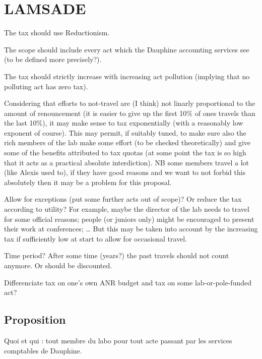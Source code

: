 \documentclass[version=3.21, pagesize, twoside=off, bibliography=totoc, DIV=calc, fontsize=12pt, a4paper, french, english]{scrartcl}
\begin{document}
\section{LAMSADE}

The tax should use Reductionism.

The scope should include every act which the Dauphine accounting services see (to be defined more precisely?).

The tax should strictly increase with increasing act pollution (implying that no polluting act has zero tax).

Considering that efforts to not-travel are (I think) not linarly proportional to the amount of renouncement (it is easier to give up the first 10\% of ones travels than the last 10\%), it may make sense to tax exponentially (with a reasonably low exponent of course). This may permit, if suitably tuned, to make sure also the rich members of the lab make some effort (to be checked theoretically) and give some of the benefits attributed to tax quotas (at some point the tax is so high that it acts as a practical absolute interdiction). NB some members travel a lot (like Alexis used to), if they have good reasons and we want to not forbid this absolutely then it may be a problem for this proposal.

Allow for exceptions (put some further acts out of scope)? Or reduce the tax according to utility? For example, maybe the director of the lab needs to travel for some official reasons; people (or juniors only) might be encouraged to present their work at conferences; … But this may be taken into account by the increasing tax if sufficiently low at start to allow for occasional travel.

Time period? After some time (years?) the past travels should not count anymore. Or should be discounted.

Differenciate tax on one’s own ANR budget and tax on some lab-or-pole-funded act?

\subsection{Proposition}
Quoi et qui : tout membre du labo pour tout acte passant par les services comptables de Dauphine.
\end{document}

